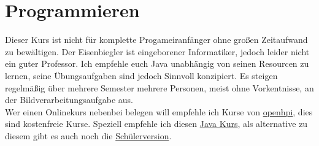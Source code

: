 \chapter{Programmieren}

Dieser Kurs ist nicht für komplette Progameiranfänger ohne großen Zeitaufwand zu bewältigen. Der Eisenbiegler ist eingeborener Informatiker, jedoch leider nicht ein guter Professor. Ich empfehle euch Java unabhängig von seinen Resourcen zu lernen, seine Übungsaufgaben sind jedoch Sinnvoll konzipiert. Es steigen regelmäßig über mehrere Semester mehrere Personen, meist ohne Vorkentnisse, an der Bildverarbeitungsaufgabe aus.\\
Wer einen Onlinekurs nebenbei belegen will empfehle ich Kurse von \href{https://open.hpi.de/courses}{openhpi}, dies sind kostenfreie Kurse. Speziell empfehle ich diesen \href{https://open.hpi.de/courses/javaeinstieg2020}{Java Kurs}, als alternative zu diesem gibt es auch noch die  \href{https://open.hpi.de/courses/javaeinstieg-schule2024}{Schülerversion}.

\newpage

\newpage
